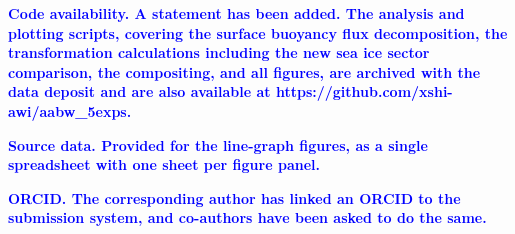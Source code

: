\documentclass[pdflatex,sn-nature]{sn-jnl}
\begin{document}
\noindent\textcolor{blue}{\textbf{\textbf{Code availability.} A statement has been added. The analysis and plotting scripts, covering the surface buoyancy flux decomposition, the transformation calculations including the new sea ice sector comparison, the compositing, and all figures, are archived with the data deposit and are also available at https://github.com/xshi-awi/aabw\_5exps.}}


\noindent\textcolor{blue}{\textbf{\textbf{Source data.} Provided for the line-graph figures, as a single spreadsheet with one sheet per figure panel.}}


\noindent\textcolor{blue}{\textbf{\textbf{ORCID.} The corresponding author has linked an ORCID to the submission system, and co-authors have been asked to do the same.}}
\end{document}
